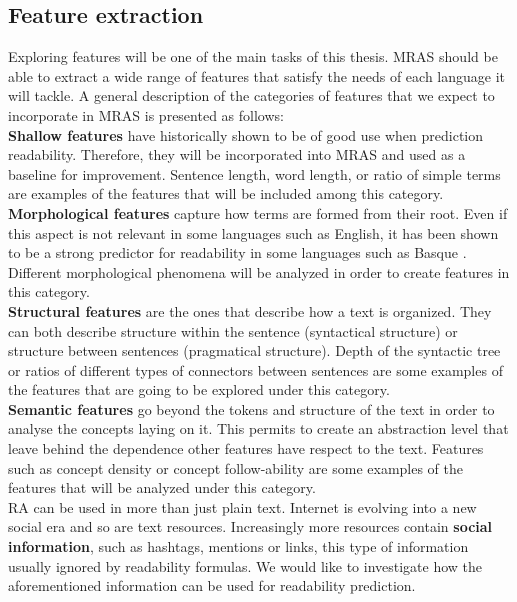 \documentclass[12pt]{article}
\begin{document}
\subsection{Feature extraction}
Exploring features will be one of the main tasks of this thesis. MRAS should be able to extract a wide range of features that satisfy the needs of each language it will tackle. A general description of the categories of features that we expect to incorporate in MRAS is presented as follows:\\


\noindent
\textbf{Shallow features} \cite{flesch1948new,chall1995readability,albright1996readability} have historically shown to be of good use when prediction readability. Therefore, they will be incorporated into MRAS and used as a baseline for improvement. Sentence length, word length, or ratio of simple terms are examples of the features that will be included among this category.\\



\noindent
\textbf{Morphological features} capture how terms are formed from their root. Even if this  aspect is not relevant in some languages such as English, it has been shown to be a strong predictor for readability in some languages such as Basque \cite{gonzalez2014simple}. Different morphological phenomena will be analyzed in order to create features in this category.\\

\noindent
\textbf{Structural features} are the ones that describe how a text is organized. They can both describe structure within the sentence (syntactical structure) or structure between sentences (pragmatical structure). Depth of the syntactic tree or ratios of different types of connectors between sentences are some examples of the features that are going to be explored under this category.\\

\noindent
\textbf{Semantic features} go beyond the tokens and structure of the text in order to analyse the concepts laying on it. This permits to create an abstraction level that leave behind the dependence other features have respect to the text. Features such as concept density or concept follow-ability are some examples of the features that will be analyzed under this category.\\


RA can be used in more than just plain text. Internet is evolving into a new social era and so are text resources. Increasingly more resources contain \textbf{social information}, such as hashtags, mentions or links, this type of information usually ignored by readability formulas. We would like to investigate how the aforementioned information can be used for readability prediction.
\end{document}
